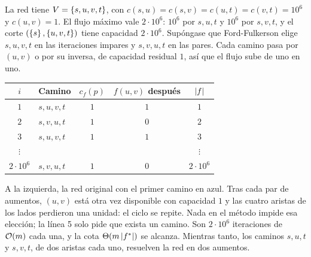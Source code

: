 \documentclass[11pt,letterpaper]{article}
\begin{document}
\begin{ejemplo}\label{ej:flujo-patologico}
  La red tiene $V = \left\{ s, u, v, t \right\}$, con
  $c(s, u) = c(s, v) = c(u, t) = c(v, t) = 10^6$ y $c(u, v) = 1$. El
  flujo máximo vale $2 \cdot 10^6$: $10^6$ por $s, u, t$ y $10^6$ por
  $s, v, t$, y el corte $(\left\{ s \right\}, \left\{ u, v, t \right\})$ tiene capacidad
  $2 \cdot 10^6$. Supóngase que Ford-Fulkerson elige $s, u, v, t$ en
  las iteraciones impares y $s, v, u, t$ en las pares. Cada camino
  pasa por $(u, v)$ o por su inversa, de capacidad residual $1$, así
  que el flujo sube de uno en uno.
  \begin{center}
  \hspace{0.8cm}
  \small
  \begin{tabular}{clccc}
    \toprule
    $i$ & \textbf{Camino} & $c_f(p)$ & $f(u, v)$ después & $\left\lvert f \right\rvert$ \\
    \midrule
    $1$ & $s, u, v, t$ & $1$ & $1$ & $1$ \\
    $2$ & $s, v, u, t$ & $1$ & $0$ & $2$ \\
    $3$ & $s, u, v, t$ & $1$ & $1$ & $3$ \\
    $\vdots$ & & & & $\vdots$ \\
    $2 \cdot 10^6$ & $s, v, u, t$ & $1$ & $0$ & $2 \cdot 10^6$ \\
    \bottomrule
  \end{tabular}
  \end{center}
  A la izquierda, la red original con el primer camino en azul. Tras
  cada par de aumentos, $(u, v)$ está otra vez disponible con
  capacidad $1$ y las cuatro aristas de los lados perdieron una
  unidad: el ciclo se repite. Nada en el método impide esa elección;
  la línea 5 solo pide que exista un camino. Son $2 \cdot 10^6$
  iteraciones de $\mathcal{O}\!\left(m\right)$ cada una, y la cota $\Theta\!\left(m \left\lvert f^* \right\rvert\right)$ se
  alcanza. Mientras tanto, los caminos $s, u, t$ y $s, v, t$, de dos
  aristas cada uno, resuelven la red en dos aumentos.
\end{ejemplo}
\end{document}
